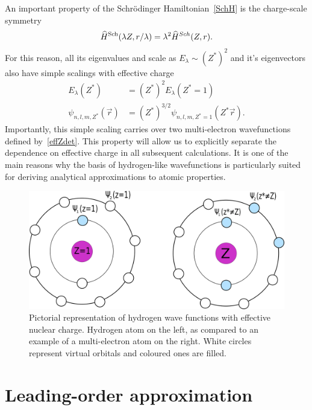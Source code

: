 An important property of the Schr\"odinger Hamiltonian~\eqref{SchH} is the charge-scale symmetry
\begin{equation}
    \widehat{H}^{\rm{Sch}}(\lambda Z, r/\lambda) = \lambda^2 \widehat{H}^{Sch}(Z,r).
\end{equation}
For this reason, all its eigenvalues and scale as $E_\lambda \sim (Z^*)^2$ and it's eigenvectors also have simple scalings with effective charge
\begin{align}
    E_{\lambda}(Z^*) &= (Z^*)^2E_{\lambda}(Z^*=1) \\
   \psi_{n,l,m,Z^*}(\vec{r}) &= (Z^*)^{3/2} \psi_{n,l,m,Z^*=1}(Z^* \vec{r}).
\end{align}
Importantly, this simple scaling carries over two multi-electron wavefunctions defined by~\eqref{effZdet}. This property will allow us to explicitly separate the dependence on effective charge in all subsequent calculations. It is one of the main reasons why the basis of hydrogen-like wavefunctions is particularly suited for deriving analytical approximations to atomic properties. 

\begin{figure} [t] 
	\centering
	\includegraphics[width=119mm]{Graphs/ECM.png} 
	\caption{Pictorial representation of hydrogen wave functions with
		effective nuclear charge. Hydrogen atom on the left, as compared to an
		example of a multi-electron atom on the right. White circles represent virtual orbitals and coloured ones are filled.} \label{fol}
\end{figure}

  \section{Leading-order approximation}
  
